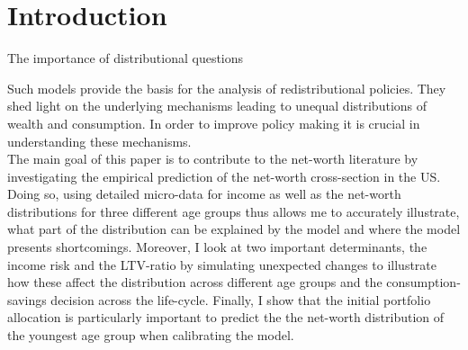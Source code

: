 \documentclass[a4paper,12pt]{article}
\begin{document}
\setcounter{page}{1}        %


\section{Introduction}
\label{Chapter1}
The importance of distributional questions

Such models provide the basis for the analysis of redistributional policies. They shed light on the underlying mechanisms leading to unequal distributions of wealth and consumption. In order to improve policy making it is crucial in understanding these mechanisms. \\

The main goal of this paper is to contribute to the net-worth literature by investigating the empirical prediction of the net-worth cross-section in the US.  
Doing so, using detailed micro-data for income as well as the net-worth distributions for three different age groups thus allows me to accurately illustrate, what part of the distribution can be explained by the model and where the model presents shortcomings. Moreover, I look at two important determinants, the income risk and the LTV-ratio by simulating unexpected changes to illustrate how these affect the distribution across different age groups and the consumption-savings decision across the life-cycle. Finally, I show that the initial portfolio allocation is particularly important to predict the the net-worth distribution of the youngest age group when calibrating the model.\\
\end{document}
